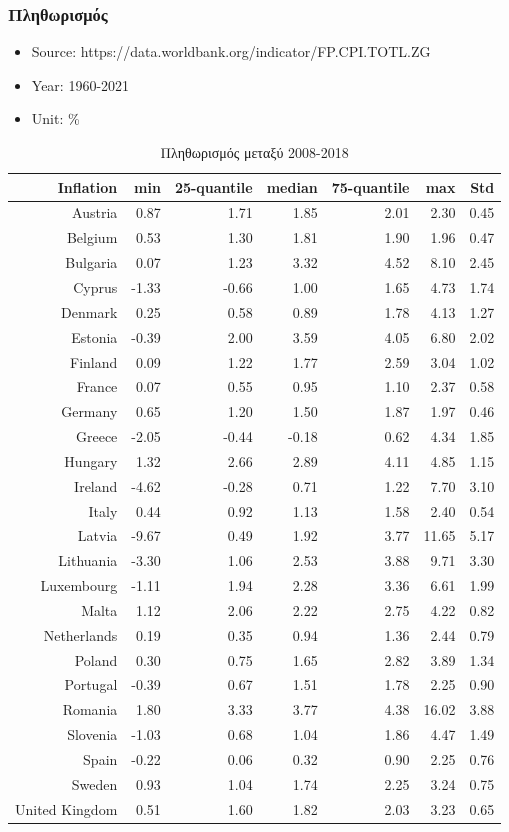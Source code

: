 \documentclass[a4paper,twoside,10pt]{article}
\begin{document}
\subsubsection{Πληθωρισμός}
	\begin{itemize}
	\item Source: https://data.worldbank.org/indicator/FP.CPI.TOTL.ZG
	\item Year: 1960-2021
	\item Unit: \%
	\end{itemize}
\begin{table}[H]
	\centering
	\begin{tabular}{|r|rrrrr|r|}
\hline
		Inflation & min & 25-quantile & median & 75-quantile & max & Std \\ 
  \hline
Austria & 0.87 & 1.71 & 1.85 & 2.01 & 2.30 & 0.45 \\ 
Belgium & 0.53 & 1.30 & 1.81 & 1.90 & 1.96 & 0.47 \\ 
Bulgaria & 0.07 & 1.23 & 3.32 & 4.52 & 8.10 & 2.45 \\ 
Cyprus & -1.33 & -0.66 & 1.00 & 1.65 & 4.73 & 1.74 \\ 
Denmark & 0.25 & 0.58 & 0.89 & 1.78 & 4.13 & 1.27 \\ 
\hline
Estonia & -0.39 & 2.00 & 3.59 & 4.05 & 6.80 & 2.02 \\ 
Finland & 0.09 & 1.22 & 1.77 & 2.59 & 3.04 & 1.02 \\ 
France & 0.07 & 0.55 & 0.95 & 1.10 & 2.37 & 0.58 \\ 
Germany & 0.65 & 1.20 & 1.50 & 1.87 & 1.97 & 0.46 \\ 
Greece & -2.05 & -0.44 & -0.18 & 0.62 & 4.34 & 1.85 \\ 
\hline
Hungary & 1.32 & 2.66 & 2.89 & 4.11 & 4.85 & 1.15 \\ 
Ireland & -4.62 & -0.28 & 0.71 & 1.22 & 7.70 & 3.10 \\ 
Italy & 0.44 & 0.92 & 1.13 & 1.58 & 2.40 & 0.54 \\ 
Latvia & -9.67 & 0.49 & 1.92 & 3.77 & 11.65 & 5.17 \\ 
Lithuania & -3.30 & 1.06 & 2.53 & 3.88 & 9.71 & 3.30 \\ 
\hline
Luxembourg & -1.11 & 1.94 & 2.28 & 3.36 & 6.61 & 1.99 \\ 
Malta & 1.12 & 2.06 & 2.22 & 2.75 & 4.22 & 0.82 \\ 
Netherlands & 0.19 & 0.35 & 0.94 & 1.36 & 2.44 & 0.79 \\ 
Poland & 0.30 & 0.75 & 1.65 & 2.82 & 3.89 & 1.34 \\ 
Portugal & -0.39 & 0.67 & 1.51 & 1.78 & 2.25 & 0.90 \\ 
\hline
Romania & 1.80 & 3.33 & 3.77 & 4.38 & 16.02 & 3.88 \\ 
Slovenia & -1.03 & 0.68 & 1.04 & 1.86 & 4.47 & 1.49 \\ 
Spain & -0.22 & 0.06 & 0.32 & 0.90 & 2.25 & 0.76 \\ 
Sweden & 0.93 & 1.04 & 1.74 & 2.25 & 3.24 & 0.75 \\ 
United Kingdom & 0.51 & 1.60 & 1.82 & 2.03 & 3.23 & 0.65 \\ 
\hline
	\end{tabular}
	\caption{Πληθωρισμός μεταξύ 2008-2018}
	\label{Inflation}
\end{table}
\end{document}
